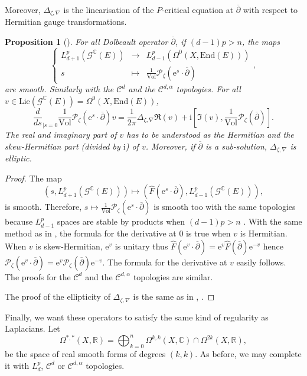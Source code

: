 \documentclass{article}
\newtheorem{proposition}[theorem]{Proposition}
\theoremstyle{remark}
\theoremstyle{definition}
\newcommand{\R}{\mathbb{R}}
\newcommand{\C}{\mathbb{C}}
\newcommand{\End}{\mathrm{End}}
\newcommand{\Vol}{\mathrm{Vol}}
\newcommand{\Lie}{\mathrm{Lie}}
\renewcommand{\i}{\boldsymbol{\mathrm{i}}}
\newcommand{\e}{\boldsymbol{\mathrm{e}}}
\newcommand{\G}{\mathcal{G}}
\newcommand{\mC}{\mathcal{C}}
\newcommand{\mP}{\mathcal{P}}
\newcommand{\dbar}{\overline{\partial}}
\newcommand{\fonction}[4]{\left\{ \begin{array}{rcl}
		\displaystyle #1 & \longrightarrow & \displaystyle #2\\
		\displaystyle #3 & \longmapsto & \displaystyle #4
	\end{array} \right.}
\begin{document}
Moreover, $\Delta_{\zeta,\nabla}$ is the linearisation of the $P$-critical equation at $\dbar$ with respect to Hermitian gauge transformations.

\begin{proposition}[{\cite[Lemma 2.36]{DMS}}]\label{PRO:Linéarisation Z-critique}
    For all Dolbeault operator $\dbar$, if $(d - 1)p > n$, the maps
    $$
    \fonction{L_{d + 1}^p(\G^\C(E))}{L_{d - 1}^p(\Omega^0(X,\End(E)))}{s}{\frac{1}{\Vol}\mP_\zeta(\e^s \cdot \dbar)},
    $$
    are smooth. Similarly with the $\mC^d$ and the $\mC^{d,\alpha}$ topologies. For all $v \in \Lie(\G^\C(E)) = \Omega^0(X,\End(E))$,
    $$
    \frac{d}{ds}_{|s = 0} \frac{1}{\Vol}\mP_\zeta(\e^s \cdot \dbar)v = \frac{1}{2\pi}\Delta_{\zeta,\nabla}\Re(v) + \i\left[\Im(v),\frac{1}{\Vol}\mP_\zeta(\dbar)\right].
    $$
    The real and imaginary part of $v$ has to be understood as the Hermitian and the skew-Hermitian part (divided by $\i$) of $v$. Moreover, if $\dbar$ is a sub-solution, $\Delta_{\zeta,\nabla}$ is elliptic.
\end{proposition}
\begin{proof}
The map
$$
(s,L_{d + 1}^p(\G^\C(E))) \mapsto (\hat{F}(\e^s \cdot \dbar),L_{d - 1}^p(\G^\C(E))),
$$
is smooth. Therefore, $s \mapsto \frac{1}{\Vol}\mP_\zeta(\e^s \cdot \dbar)$ is smooth too with the same topologies because $L_{d - 1}^p$ spaces are stable by products when $(d - 1)p > n$ \cite[Theorem 4.12]{Adams_Fournier}. With the same method as in \cite[Section 2.3.1]{DMS}, the formula for the derivative at $0$ is true when $v$ is Hermitian. When $v$ is skew-Hermitian, $\e^v$ is unitary thus $\hat{F}(\e^v \cdot \dbar) = \e^v\hat{F}(\dbar)\e^{-v}$ hence $\mP_\zeta(\e^v \cdot \dbar) = \e^v\mP_\zeta(\dbar)\e^{-v}$. The formula for the derivative at $v$ easily follows. The proofs for the $\mC^d$ and the $\mC^{d,\alpha}$ topologies are similar.

The proof of the ellipticity of $\Delta_{\zeta,\nabla}$ is the same as in \cite[Lemma 2.36]{DMS}, \cite[Lemma 3.3]{Takahashi}.
\end{proof}

Finally, we want these operators to satisfy the same kind of regularity as Laplacians. Let
$$
\Omega^{*,*}(X,\R) = \bigoplus_{k = 0}^n \Omega^{k,k}(X,\C) \cap \Omega^{2k}(X,\R),
$$
be the space of real smooth forms of degrees $(k,k)$. As before, we may complete it with $L_d^p$, $\mC^d$ or $\mC^{d,\alpha}$ topologies.
\end{document}

